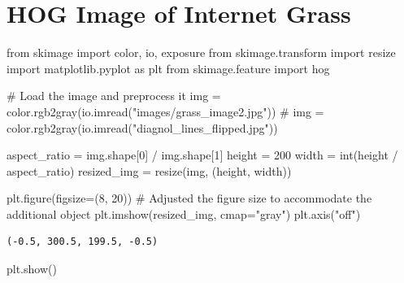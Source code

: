 \documentclass[
  letterpaper,
]{report}
\newenvironment{Shaded}{\begin{snugshade}}{\end{snugshade}}
\newcommand{\BuiltInTok}[1]{\textcolor[rgb]{0.00,0.23,0.31}{#1}}
\newcommand{\CommentTok}[1]{\textcolor[rgb]{0.37,0.37,0.37}{#1}}
\newcommand{\DecValTok}[1]{\textcolor[rgb]{0.68,0.00,0.00}{#1}}
\newcommand{\ImportTok}[1]{\textcolor[rgb]{0.00,0.46,0.62}{#1}}
\newcommand{\NormalTok}[1]{\textcolor[rgb]{0.00,0.23,0.31}{#1}}
\newcommand{\OperatorTok}[1]{\textcolor[rgb]{0.37,0.37,0.37}{#1}}
\newcommand{\StringTok}[1]{\textcolor[rgb]{0.13,0.47,0.30}{#1}}
\begin{document}
\hypertarget{hog-image-of-internet-grass}{%
\section{HOG Image of Internet
Grass}\label{hog-image-of-internet-grass}}

\begin{Shaded}
\begin{Highlighting}[]
\ImportTok{from}\NormalTok{ skimage }\ImportTok{import}\NormalTok{ color, io, exposure}
\ImportTok{from}\NormalTok{ skimage.transform }\ImportTok{import}\NormalTok{ resize}
\ImportTok{import}\NormalTok{ matplotlib.pyplot }\ImportTok{as}\NormalTok{ plt}
\ImportTok{from}\NormalTok{ skimage.feature }\ImportTok{import}\NormalTok{ hog}

\CommentTok{\# Load the image and preprocess it}
\NormalTok{img }\OperatorTok{=}\NormalTok{ color.rgb2gray(io.imread(}\StringTok{"images/grass\_image2.jpg"}\NormalTok{))}
\CommentTok{\# img = color.rgb2gray(io.imread("diagnol\_lines\_flipped.jpg"))}

\NormalTok{aspect\_ratio }\OperatorTok{=}\NormalTok{ img.shape[}\DecValTok{0}\NormalTok{] }\OperatorTok{/}\NormalTok{ img.shape[}\DecValTok{1}\NormalTok{]}
\NormalTok{height }\OperatorTok{=} \DecValTok{200}
\NormalTok{width }\OperatorTok{=} \BuiltInTok{int}\NormalTok{(height }\OperatorTok{/}\NormalTok{ aspect\_ratio)}
\NormalTok{resized\_img }\OperatorTok{=}\NormalTok{ resize(img, (height, width))}

\NormalTok{plt.figure(figsize}\OperatorTok{=}\NormalTok{(}\DecValTok{8}\NormalTok{, }\DecValTok{20}\NormalTok{))  }\CommentTok{\# Adjusted the figure size to accommodate the additional object}
\NormalTok{plt.imshow(resized\_img, cmap}\OperatorTok{=}\StringTok{"gray"}\NormalTok{)}
\NormalTok{plt.axis(}\StringTok{"off"}\NormalTok{)}
\end{Highlighting}
\end{Shaded}

\begin{verbatim}
(-0.5, 300.5, 199.5, -0.5)
\end{verbatim}

\begin{Shaded}
\begin{Highlighting}[]
\NormalTok{plt.show()}
\end{Highlighting}
\end{Shaded}
\end{document}
